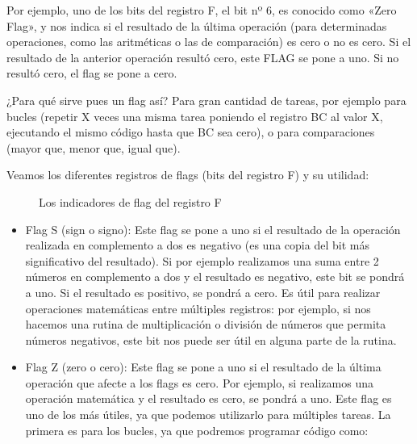 \documentclass[letterpaper,10pt,spanish]{sphinxmanual}
\begin{document}
Por ejemplo, uno de los bits del registro F, el bit nº 6, es conocido como «Zero Flag», y nos indica si el resultado de la última operación (para determinadas operaciones, como las aritméticas o las de comparación) es cero o no es cero. Si el resultado de la anterior operación resultó cero, este FLAG se pone a uno. Si no resultó cero, el flag se pone a cero.

¿Para qué sirve pues un flag así? Para gran cantidad de tareas, por ejemplo para bucles (repetir X veces una misma tarea poniendo el registro BC al valor X, ejecutando el mismo código hasta que BC sea cero), o para comparaciones (mayor que, menor que, igual que).

Veamos los diferentes registros de flags (bits del registro F) y su utilidad:

\begin{figure}[htbp]
\centering
\capstart

\noindent{}
\caption{Los indicadores de flag del registro F}\label{\detokenize{04_lenguaje_ensamblador_01/lenguaje_ensamblador_01:id1}}\end{figure}
\begin{itemize}
\item {} 
Flag S (sign o signo): Este flag se pone a uno si el resultado de la operación realizada en complemento a dos es negativo (es una copia del bit más significativo del resultado). Si por ejemplo realizamos una suma entre 2 números en complemento a dos y el resultado es negativo, este bit se pondrá a uno. Si el resultado es positivo, se pondrá a cero. Es útil para realizar operaciones matemáticas entre múltiples registros: por ejemplo, si nos hacemos una rutina de multiplicación o división de números que permita números negativos, este bit nos puede ser útil en alguna parte de la rutina.

\item {} 
Flag Z (zero o cero): Este flag se pone a uno si el resultado de la última operación que afecte a los flags es cero. Por ejemplo, si realizamos una operación matemática y el resultado es cero, se pondrá a uno. Este flag es uno de los más útiles, ya que podemos utilizarlo para múltiples tareas. La primera es para los bucles, ya que podremos programar código como:

\end{itemize}

\begin{sphinxVerbatim}[commandchars=\\\{\}]
  

         
  
\end{sphinxVerbatim}
\end{document}
